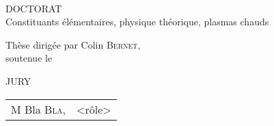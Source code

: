 \thispagestyle{empty}
\begin{center}
\LARGE
\insertinstitute\\
\insertlabo

\vspace{3cm}

DOCTORAT\\
{\Large Constituants élémentaires, physique théorique, plasmas chauds}

\vspace{3cm}

\insertauthor

\vspace{1cm}

\textbf{\huge\inserttitle}

\vspace{1cm}

Thèse dirigée par Colin \textsc{Bernet},\\
soutenue le \insertdate

\vfill
JURY\\
\begin{tabular}{ll}
M Bla \textsc{Bla}, & <rôle>
\end{tabular}

\vspace{1cm}
\end{center}